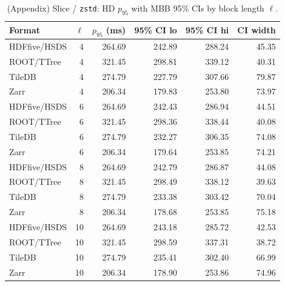 \documentclass[nomenclature, english, bibtex]{kththesis}
\numberwithin{listing}{chapter}
\begin{document}
\begin{table}[H]
  \centering
  \caption*{(Appendix) Slice / \texttt{zstd}: \gls{HD} $p_{95}$ with \gls{MBB} 95\% \glspl{CI} by block length \(\ell\).}
  \begin{tabular}{l r r r r r}
    \toprule
    Format & \(\ell\) & $p_{95}$ (ms) & 95\% \gls{CI} lo & 95\% \gls{CI} hi & \gls{CI} width \\
    \midrule
    \gls{HDFfive}/\gls{HSDS} & 4  & 264.69 & 242.89 & 288.24 & 45.35 \\
    \gls{ROOT}/\gls{TTree} & 4  & 321.45 & 298.81 & 339.12 & 40.31 \\
    TileDB & 4 & 274.79 & 227.79 & 307.66 & 79.87 \\
    Zarr & 4  & 206.34 & 179.83 & 253.80 & 73.97 \\
    \gls{HDFfive}/\gls{HSDS} & 6  & 264.69 & 242.43 & 286.94 & 44.51 \\
    \gls{ROOT}/\gls{TTree} & 6  & 321.45 & 298.36 & 338.44 & 40.08 \\
    TileDB & 6 & 274.79 & 232.27 & 306.35 & 74.08 \\
    Zarr & 6  & 206.34 & 179.64 & 253.85 & 74.21 \\
    \gls{HDFfive}/\gls{HSDS} & 8  & 264.69 & 242.79 & 286.87 & 44.08 \\
    \gls{ROOT}/\gls{TTree} & 8  & 321.45 & 298.49 & 338.12 & 39.63 \\
    TileDB & 8 & 274.79 & 233.38 & 303.42 & 70.04 \\
    Zarr & 8  & 206.34 & 178.68 & 253.85 & 75.18 \\
    \gls{HDFfive}/\gls{HSDS} & 10 & 264.69 & 243.18 & 285.72 & 42.53 \\
    \gls{ROOT}/\gls{TTree} & 10 & 321.45 & 298.59 & 337.31 & 38.72 \\
    TileDB & 10& 274.79 & 235.41 & 302.40 & 66.99 \\
    Zarr & 10 & 206.34 & 178.90 & 253.86 & 74.96 \\
    \bottomrule
  \end{tabular}
\end{table}
\end{document}
